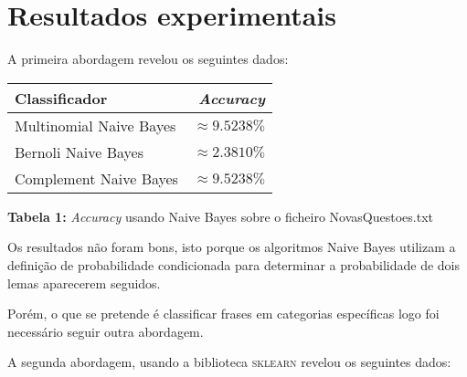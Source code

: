 \documentclass[12pt]{article}
\begin{document}
\break
\section*{Resultados experimentais}
A primeira abordagem revelou os seguintes dados:

\begin{center}
    \begin{tabular}{ l | r }
      \hline
      \textbf{Classificador} & \textbf{\textit{Accuracy}} \\ \hline
      Multinomial Naive Bayes & $\approx 9.5238\%$ \\ \hline
      Bernoli Naive Bayes & $\approx2.3810\%$ \\ \hline
      Complement Naive Bayes & $\approx 9.5238\%$ \\
      \hline
    \end{tabular}
  \end{center}
  \textbf{Tabela 1:} \textit{Accuracy} usando Naive Bayes sobre o ficheiro NovasQuestoes.txt \newline

Os resultados não foram bons, isto porque os algoritmos Naive Bayes utilizam a definição de probabilidade condicionada para determinar a probabilidade de dois lemas aparecerem seguidos.

Porém, o que se pretende é classificar frases em categorias específicas logo foi necessário seguir outra abordagem. \newline

A segunda abordagem, usando a biblioteca \textsc{sklearn} revelou os seguintes dados:
\end{document}
